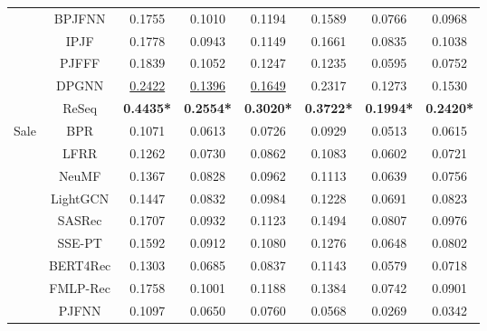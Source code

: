 \begin{table}[]
{{\begin{tabular}{@{}cccccccc@{}}
                             & BPJFNN      & 0.1755          & 0.1010           & 0.1194          & 0.1589          & 0.0766          & 0.0968          \\
                             & IPJF        & 0.1778          & 0.0943          & 0.1149          & 0.1661          & 0.0835          & 0.1038          \\
                             & PJFFF       & 0.1839          & 0.1052          & 0.1247          & 0.1235          & 0.0595          & 0.0752          \\
                             & DPGNN       & \underline{0.2422}    & \underline{0.1396}    & \underline{0.1649}    & 0.2317          & 0.1273          & 0.1530           \\ \cmidrule(l){2-8}
                             & ReSeq        & \textbf{0.4435*} & \textbf{0.2554*} & \textbf{0.3020*}  & \textbf{0.3722*} & \textbf{0.1994*} & \textbf{0.2420*}  \\ \midrule
\multirow{13}{*}{Sale}       & BPR         & 0.1071          & 0.0613          & 0.0726          & 0.0929          & 0.0513          & 0.0615          \\
                             & LFRR        & 0.1262          & 0.0730           & 0.0862          & 0.1083          & 0.0602          & 0.0721          \\
                             & NeuMF       & 0.1367          & 0.0828          & 0.0962          & 0.1113          & 0.0639          & 0.0756          \\
                             & LightGCN    & 0.1447          & 0.0832          & 0.0984          & 0.1228          & 0.0691          & 0.0823          \\ \cmidrule(l){2-8}
                             & SASRec      & 0.1707          & 0.0932          & 0.1123          & 0.1494          & 0.0807          & 0.0976          \\
                             & SSE-PT      & 0.1592	& 0.0912	& 0.1080	& 0.1276	& 0.0648	& 0.0802 \\
                             & BERT4Rec    & 0.1303          & 0.0685          & 0.0837          & 0.1143          & 0.0579          & 0.0718          \\
                             & FMLP-Rec     & 0.1758          & 0.1001          & 0.1188          & 0.1384          & 0.0742          & 0.0901          \\ \cmidrule(l){2-8}
                             & PJFNN       & 0.1097          & 0.0650           & 0.0760           & 0.0568          & 0.0269          & 0.0342          \\

\end{tabular}}}
\end{table}
